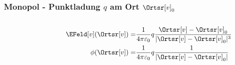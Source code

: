 \begin{frame}

  \frametitle{Monopol - Punktladung $q$ am Ort $\Ortsr[v]_0$}

  \begin{columns}[T]
    \begin{column}{.3\linewidth}
      
    \end{column}
    \begin{column}{.7\linewidth}
      \begin{align*}
      \EFeld[v](\Ortsr[v]) = & \frac{1}{4\pi\varepsilon_0} q\frac{\Ortsr[v]-\Ortsr[v]_0}{|\Ortsr[v]-\Ortsr[v]_0|^3} \\
        \phi (\Ortsr[v]) = & \frac{1}{4\pi\varepsilon_0} q\frac{1}{|\Ortsr[v]-\Ortsr[v]_0|}
      \end{align*}
      \end{column}
\end{columns}
\end{frame}

